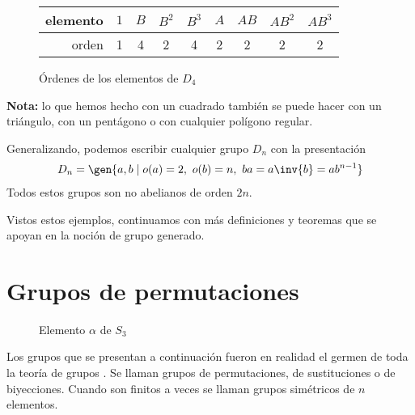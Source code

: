 \begin{ej}
	\begin{figure}[h]
		\centering
		\begin{tabular}{r|cccccccc}
			elemento & $1$ & $B$ & $B^2$ & $B^3$ & $A$ & $AB$ & $AB^2$ & $AB^3$ \\ \hline
			orden   &  1  &  4  &   2   &   4   &  2  &  2   &   2    &   2
		\end{tabular}
		\caption{Órdenes de los elementos de $D_4$}
	\end{figure}
	
	\textbf{Nota:} lo que hemos hecho con un cuadrado también se puede hacer con un triángulo, con un pentágono o con cualquier polígono regular.
\end{ej}

\begin{ej}
	\label{ej:diedricosordengenerico}
	Generalizando, podemos escribir cualquier grupo $D_n$ con la presentación
	\begin{align*}
		D_n = \gen{a, b \mid o(a) = 2,\ o(b) = n,\ ba = a\inv{b} = ab^{n-1}}
	\end{align*}
	Todos estos grupos son no abelianos de orden $2n$.
\end{ej}

Vistos estos ejemplos, continuamos con más definiciones y teoremas que se apoyan en la noción de grupo generado.

\section{Grupos de permutaciones}

\begin{wrapfigure}{r}{0.3\textwidth}
	\centering
	\caption{Elemento $\alpha$ de $S_3$}
	\label{fig:alphaens3}
\end{wrapfigure}

Los grupos que se presentan a continuación fueron en realidad el germen de toda la teoría de grupos \cite{dor96}. Se llaman grupos de permutaciones, de sustituciones o de biyecciones. Cuando son finitos a veces se llaman grupos simétricos de $n$ elementos.

